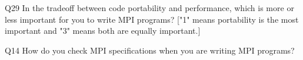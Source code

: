 \begin{description}%
\item{Q29} In the tradeoff between code portability and performance, which is more or less important for you to write MPI programs? ["1" means portability is the most important and "3" means both are equally important.]%
\item{Q14} How do you check MPI specifications when you are writing MPI programs?%
\end{description}%
